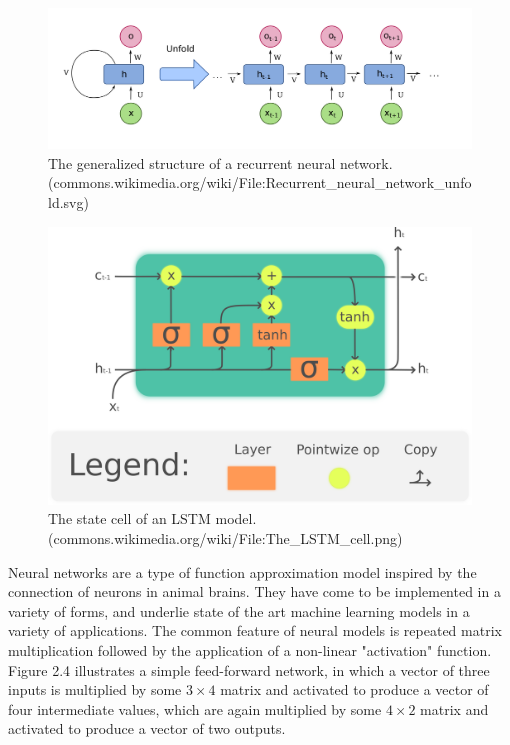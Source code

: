 \begin{figure}[p]
\includegraphics[width=12cm]{images/RNN.png}
\centering
\caption{The generalized structure of a recurrent neural network. \\ (commons.wikimedia.org/wiki/File:Recurrent\_neural\_network\_unfold.svg)}
\end{figure}

\begin{figure}[p]
\includegraphics[width=12cm]{images/The_LSTM_cell.png}
\centering
\caption{The state cell of an LSTM model. \\ (commons.wikimedia.org/wiki/File:The\_LSTM\_cell.png)}
\end{figure}

Neural networks are a type of function approximation model inspired by the connection of neurons in animal brains. They have come to be implemented in a variety of forms, and underlie state of the art machine learning models in a variety of applications. The common feature of neural models is repeated matrix multiplication followed by the application of a non-linear "activation" function. Figure 2.4 illustrates a simple feed-forward network, in which a vector of three inputs is multiplied by some $3 \times 4$ matrix and activated to produce a vector of four intermediate values, which are again multiplied by some $4 \times 2$ matrix and activated to produce a vector of two outputs.

